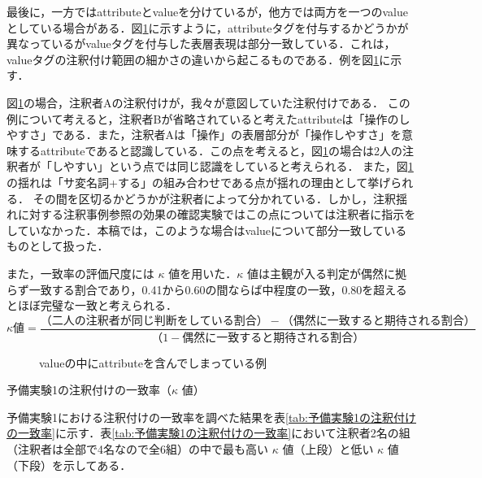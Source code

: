 \documentclass[japanese]{jnlp_1.4}
\begin{document}
最後に，一方ではattributeとvalueを分けているが，他方では両方を一つのvalueとしている場合がある．図\ref{fig:valueの中にattributeを含んでしまっている例}に示すように，attributeタグを付与するかどうかが異なっているがvalueタグを付与した表層表現は部分一致している．これは，valueタグの注釈付け範囲の細かさの違いから起こるものである．例を図\ref{fig:valueの中にattributeを含んでしまっている例}に示す．

図\ref{fig:valueの中にattributeを含んでしまっている例}の場合，注釈者Aの注釈付けが，我々が意図していた注釈付けである．
この例について考えると，注釈者Bが省略されていると考えたattributeは「操作のしやすさ」である．また，注釈者Aは「操作」の表層部分が「操作しやすさ」を意味するattributeであると認識している．この点を考えると，図\ref{fig:valueの中にattributeを含んでしまっている例}の場合は2人の注釈者が「しやすい」という点では同じ認識をしていると考えられる．
また，図\ref{fig:valueの中にattributeを含んでしまっている例}の揺れは「サ変名詞+する」の組み合わせである点が揺れの理由として挙げられる．
その間を区切るかどうかが注釈者によって分かれている．しかし，注釈揺れに対する注釈事例参照の効果の確認実験ではこの点については注釈者に指示をしていなかった．本稿では，このような場合はvalueについて部分一致しているものとして扱った．


また，一致率の評価尺度には $\kappa$ 値を用いた．$\kappa$ 値は主観が入る判定が偶然に拠らず一致する割合であり，0.41から0.60の間ならば中程度の一致，0.80を超えるとほぼ完璧な一致と考えられる．
\begin{equation}
\kappa 値=\frac{（二人の注釈者が同じ判断をしている割合）-（偶然に一致すると期待される割合）}{（1-偶然に一致すると期待される割合）}
\end{equation}

\begin{figure}[b]

\caption{valueの中にattributeを含んでしまっている例}
\label{fig:valueの中にattributeを含んでしまっている例}
\end{figure}
\begin{table}[b]
\caption{予備実験1の注釈付けの一致率（$\kappa$ 値）}
\label{tab:予備実験1の注釈付けの一致率}

\end{table}



予備実験1における注釈付けの一致率を調べた結果を表\ref{tab:予備実験1の注釈付けの一致率}に示す．表\ref{tab:予備実験1の注釈付けの一致率}において注釈者2名の組（注釈者は全部で4名なので全6組）の中で最も高い $\kappa$ 値（上段）と低い $\kappa$ 値（下段）を示してある．
\end{document}
